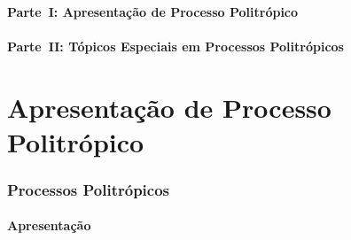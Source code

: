 \subsection{Parte~I: Apresentação de Processo Politrópico}


\subsection{Parte~II: Tópicos Especiais em Processos Politrópicos}


\part{Apresentação de Processo Politrópico}

\section{Processos Politrópicos}

\subsection{Apresentação}

